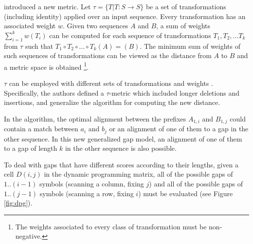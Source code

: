 \begin{center}
\end{center}

 introduced a new metric. Let $\tau = \{T|T: S \rightarrow S\}$ be a set of
transformations (including identity) applied over an input sequence. Every transformation has an associated
weight $w$. Given two sequences $A$ and $B$, a sum of weights $\sum_{i=1}^{k}{w(T_i)}$ can be computed
for each sequence of transformations $T_1,T_2, \ldots T_k$ from $\tau$ such that 
$T_1 \circ T_2 \circ \ldots \circ T_k (A) = (B)$. The minimum sum of weights of such sequences of 
transformations can be viewed as the distance from $A$ to $B$ and a metric space is obtained 
\footnote{The weights associated to every class of transformation must be non-negative.}.

$\tau$ can be employed with different sets of transformations and weights \citep{waterman:1976a}. 
Specifically, the authors defined a $\tau$-metric which included longer deletions and insertions, and
generalize the \citeauthor{sellers:1974a} algorithm for computing the new distance.


In the \citeauthor{sellers:1974a} algorithm, the optimal alignment between the prefixes $A_{1,i}$ and $B_{1,j}$ 
could contain a match between $a_i$ and $b_j$ or an alignment of one of them to a gap in the other sequence. 
In this new generalized gap model, an alignment of one of them to a gap of length $k$ in the other sequence is 
also possible.

To deal with gaps that have different scores according to their lengths, given a cell $D(i,j)$ in the 
dynamic programming matrix, all of the possible gaps of $1..(i-1)$ symbols (scanning a column, fixing $j$)
and all of the possible gaps of $1..(j-1)$ symbols (scanning a row, fixing $i$) must be evaluated (see 
Figure \ref{fig:dpg}). 

